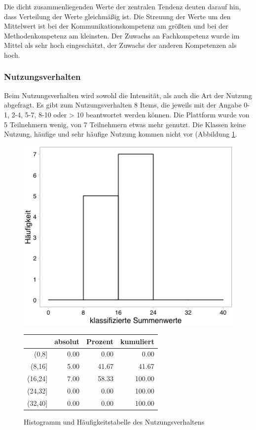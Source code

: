 \documentclass[12pt, bibliography=totoc]{scrartcl}
\begin{document}
Die dicht zusammenliegenden Werte der zentralen Tendenz deuten darauf
hin, dass Verteilung der Werte gleichmäßig ist. Die Streuung der Werte
um den Mittelwert ist bei der Kommunikationskompetenz am größten und bei
der Methodenkompetenz am kleinsten. Der Zuwachs an Fachkompetenz wurde
im Mittel als sehr hoch eingeschätzt, der Zuwachs der anderen
Kompetenzen als hoch.

\subsubsection{Nutzungsverhalten}\label{nutzungsverhalten}

Beim Nutzungsverhalten wird sowohl die Intensität, als auch die Art der
Nutzung abgefragt. Es gibt zum Nutzungsverhalten 8 Items, die jeweils
mit der Angabe 0-1, 2-4, 5-7, 8-10 oder \textgreater{} 10 beantwortet
werden können. Die Plattform wurde von 5 Teilnehmern wenig, von 7
Teilnehmern etwas mehr genutzt. Die Klassen keine Nutzung, häufige und
sehr häufige Nutzung kommen nicht vor (Abbildung \ref{fig:NV}.

\begin{figure}[H]
\begin{minipage}{.4\linewidth}
\includegraphics[width=0.8\linewidth]{Anhang/NVHistnn.png}

\label{pic:aufbau}
\end{minipage}
\begin{minipage}{.4\linewidth}
\centering
\raisebox{\depth}
{\begin{tabular}{rrrr}
  \hline
 & absolut & Prozent & kumuliert \\ 
  \hline
(0,8] & 0.00 & 0.00 & 0.00 \\ 
  (8,16] & 5.00 & 41.67 & 41.67 \\ 
  (16,24] & 7.00 & 58.33 & 100.00 \\ 
  (24,32] & 0.00 & 0.00 & 100.00 \\ 
  (32,40] & 0.00 & 0.00 & 100.00 \\ 
   \hline
\end{tabular}

}
\label{tab:defis}
\end{minipage}
\caption{Histogramm und Häufigkeitstabelle des Nutzungsverhaltens}
\label{fig:NV}
\end{figure}
\end{document}
